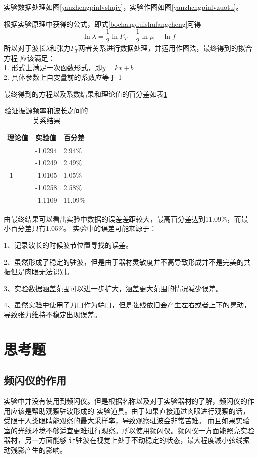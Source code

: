 \documentclass{ctexart}
\begin{document}
  实验数据处理如图\ref{yanzhengpinlvshujv}，实验作图如图\ref{yanzhengpinlvzuotu}。

  根据实验原理中获得的公式，即式\ref{bochangduishufangcheng}可得
  $$\ln \lambda = \frac{1}{2} \ln F_{T}-\frac{1}{2} \ln \mu - \ln f$$
  所以对于波长$\lambda$和张力$F_{T}$两者关系进行数据处理，并运用作图法，最终得到的拟合方程
  应该满足：\\
  1. 形式上满足一次函数形式，即$y=kx+b$\\
  2. 具体参数上自变量前的系数应等于-1


  最终得到的方程以及系数结果和理论值的百分差如表\ref{yanzhengpinlvbaifencha}
  \begin{table}[h]
    \centering   
    \caption{验证振源频率和波长之间的关系结果}\label{yanzhengpinlvbaifencha}
    \begin{tabular}{| l || l || l |}
        \hline
        理论值 & 实验值 & 百分差\\
        \hline
        \multirow{5}{*}{-1} & -1.0294 & 2.94\% \\
        \cline{2-3}
        & -1.0249 & 2.49\% \\
        \cline{2-3}
        & -1.0105 & 1.05\% \\
        \cline{2-3}
        & -1.0258 & 2.58\% \\
        \cline{2-3}
        & -1.1109 & 11.09\% \\
        \hline                   
    \end{tabular}
  \end{table}

  由最终结果可以看出实验中数据的误差差距较大，最高百分差达到11.09\%，而最小百分差只有1.05\%。
  实验中的误差可能来源于：

  1、记录波长的时候波节位置寻找的误差。

  2、虽然形成了稳定的驻波，但是由于器材灵敏度并不高导致形成并不是完美的共振但是肉眼无法识别。

  3、实验数据涵盖范围可以进一步扩大，涵盖更大范围的情况减少误差。

  4、虽然实验中使用了刀口作为端口，但是弦线依旧会产生左右或者上下的晃动，导致张力维持不稳定出现误差。
\newpage

\section{思考题}
  \subsection{频闪仪的作用}
  实验中并没有使用到频闪仪。但是根据名称以及对于实验器材的了解，频闪仪的作用应该是帮助观察驻波形成的
  实验道具。由于如果直接通过肉眼进行观察的话，受限于人类眼睛能观察的最大采样率，导致观察驻波会非常苦难。
  而且如果实验室的光线环境不够适宜更难进行观察。所以使用频闪仪。频闪仪一方面能照亮实验器材，另一方面能够
  让驻波在视觉上处于不动稳定的状态，最大程度减小弦线振动残影产生的影响。
\end{document}
